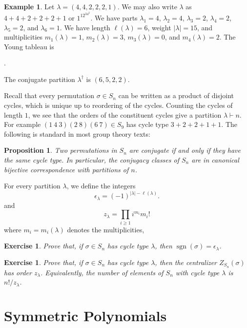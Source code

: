 \documentclass[12pt]{article}
\theoremstyle{plain}
\newtheorem{proposition}[theorem]{Proposition}
\newtheorem{exercise}[theorem]{Exercise}
\theoremstyle{definition}
\newtheorem{example}[theorem]{Example}
\theoremstyle{remark}
\numberwithin{equation}{section}
\begin{document}
\begin{example}
Let $\lambda = (4,4,2,2,2,1)$.
We may also write $\lambda$ as $4+4+2+2+2+1$ or $1^12^34^2$.
We have parts $\lambda_1=4$, $\lambda_2=4$,
$\lambda_3=2$,
$\lambda_4=2$,
$\lambda_5=2$, and
$\lambda_6=1$.
We have length $\ell(\lambda)=6$, weight $|\lambda|=15$,
and multiplicities $m_1(\lambda)=1$, $m_2(\lambda)=3$,
$m_3(\lambda)=0$, and $m_4(\lambda)=2$.
The Young tableau is
\begin{center}
.
\end{center}
The conjugate partition $\lambda^\dag$ is $(6,5,2,2)$.
\end{example}

Recall that every permutation $\sigma \in S_n$ can be written as a
product of disjoint cycles, which is unique up to reordering of
the cycles.  Counting the cycles of length $1$, we see that the orders
of the constituent cycles give a partition $\lambda \vdash n$.
For example $(1\ 4\ 3)(2\ 8)(6\ 7) \in S_9$ has cycle type
$3+2+2+1+1$.
The following is standard in most group theory texts:

\begin{proposition}
Two permutations in $S_n$ are conjugate if and only if they have the
same cycle type.
In particular, the conjugacy classes of $S_n$ are in canonical bijective
correspondence with partitions of $n$.
\end{proposition}

For every partition $\lambda$, we define the integers
\[
\epsilon_\lambda = (-1)^{|\lambda|-\ell(\lambda)} .
\]
and
\[
z_\lambda = \prod_{i \ge 1} i^{m_i} m_i!
\]
where $m_i=m_i(\lambda)$ denotes the multiplicities,

\begin{exercise}
Prove that, if $\sigma \in S_n$ has cycle type $\lambda$,
then $\operatorname{sgn}(\sigma)=\epsilon_\lambda$.
\end{exercise}

\begin{exercise}
Prove that, if $\sigma \in S_n$ has cycle type $\lambda$,
then the centralizer $Z_{S_n}(\sigma)$ has order $z_\lambda$.
Equivalently, the number of elements of $S_n$ with cycle type $\lambda$
is $n!/z_\lambda$.
\end{exercise}

\section{Symmetric Polynomials}
\end{document}
